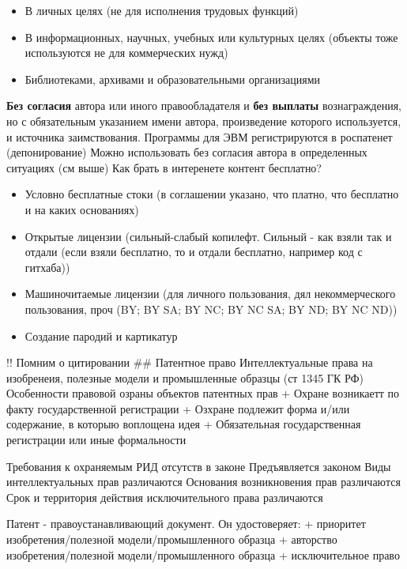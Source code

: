 \documentclass[12pt]{article}
\begin{document}
\begin{itemize}
\item
  В личных целях (не для исполнения трудовых функций)
\item
  В информационных, научных, учебных или культурных целях (объекты тоже
  используются не для коммерческих нужд)
\item
  Библиотеками, архивами и образовательными организациями
\end{itemize}

\textbf{Без согласия} автора или иного правообладателя и \textbf{без
выплаты} вознаграждения, но с обязательным указанием имени автора,
произведение которого используется, и источника заимствования. Программы
для ЭВМ регистрируются в роспатенет (депонирование) Можно использовать
без согласия автора в определенных ситуациях (см выше) Как брать в
интеренете контент бесплатно?

\begin{itemize}
\item
  Условно бесплатные стоки (в соглашении указано, что платно, что
  бесплатно и на каких основаниях)
\item
  Открытые лицензии (сильный-слабый копилефт. Сильный - как взяли так и
  отдали (если взяли бесплатно, то и отдали бесплатно, например код с
  гитхаба))
\item
  Машиночитаемые лицензии (для личного пользования, дял некоммерческого
  пользования, проч (BY; BY SA; BY NC; BY NC SA; BY ND; BY NC ND))
\item
  Создание пародий и картикатур
\end{itemize}

!! Помним о цитировании \#\# Патентное право Интеллектуальные права на
изобренеия, полезные модели и промышленные образцы (ст 1345 ГК РФ)
Особенности правовой озраны объектов патентных прав + Охране возникаетт
по факту государственной регистрации + Озхране подлежит форма и/или
содержание, в которыю воплощена идея + Обязательная государственная
регистрации или иные формальности

Требования к охраняемым РИД отсутств в законе
Предъявляется законом
Виды интеллектуальных прав различаются
Основания возникновения прав различаются
Срок и территория действия исключительного права различаются

Патент - правоустанавливающий документ. Он удостоверяет: + приоритет
изобретения/полезной модели/промышленного образца + авторство
изобретения/полезной модели/промышленного образца + исключительное право
\end{document}
